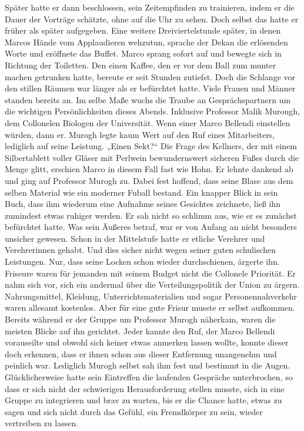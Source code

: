 Später hatte er dann beschlossen, sein Zeitempfinden zu trainieren, indem er die Dauer der Vorträge schätzte, ohne auf die Uhr zu sehen. Doch selbst das hatte er früher als später aufgegeben.
Eine weitere Dreiviertelstunde später, in denen Marcos Hände vom Applaudieren wehzutun, sprache der Dekan die erlösenden Worte und eröffnete das Buffet. Marco sprang sofort auf und bewegte sich in Richtung der Toiletten. Den einen Kaffee, den er vor dem Ball zum munter machen getrunken hatte, bereute er seit Stunden zutiefst. Doch die Schlange vor den stillen Räumen war länger als er befürchtet hatte. Viele Frauen und Männer standen bereits an. Im selbe Maße wuchs die Traube an Gesprächspartnern um die wichtigen Persönlichkeiten dieses Abends. Inklusive Professor Malik Murough, dem Collonelen Biologen der Universität. Wenn einer Marco Bellendi einstellen würden, dann er. Murogh legte kaum Wert auf den Ruf eines Mitarbeiters, lediglich auf seine Leistung.
„Einen Sekt?“ Die Frage des Kellners, der mit einem Silbertablett voller Gläser mit Perlwein bewundernswert sicheren Fußes durch die Menge glitt, erschien Marco in diesem Fall fast wie Hohn. Er lehnte dankend ab und ging auf Professor Murogh zu. Dabei fest hoffend, dass seine Blase aus dem selben Material wie ein moderner Fuball bestand.
Ein knapper Blick in sein Buch, dass ihm wiederum eine Aufnahme seines Gesichtes zeichnete, ließ ihn zumindest etwas ruhiger werden. Er sah nicht so schlimm aus, wie er es zunächst befürchtet hatte. Was sein Äußeres betraf, war er von Anfang an nicht besonders unsicher gewesen. Schon in der Mittelstufe hatte er etliche Verehrer und Verehrerinnen gehabt. Und dies sicher nicht wegen seiner guten schulischen Leistungen.
Nur, dass seine Locken schon wieder durchschienen, ärgerte ihn. Friseure waren für jemanden mit seinem Budget nicht die Collonele Priorität. Er nahm sich vor, sich ein andermal über die Verteilungspolitik der Union zu ärgern. Nahrungsmittel, Kleidung, Unterrichtsmaterialien und sogar Personennahverkehr waren allesamt kostenlos. Aber für eine gute Frisur musste er selbst aufkommen.
Bereits während er der Gruppe um Professor Murogh näherkam, waren die meisten Blicke auf ihn gerichtet. Jeder kannte den Ruf, der Marco Bellendi vorauseilte und obwohl sich keiner etwas anmerken lassen wollte, konnte dieser doch erkennen, dass er ihnen schon aus dieser Entfernung unangenehm und peinlich war. Lediglich Murogh selbst sah ihm fest und bestimmt in die Augen.
Glücklicherweise hatte sein Eintreffen die laufenden Gespräche unterbrochen, so dass er sich nicht der schwierigen Herausforderung stellen musste, sich in eine Gruppe zu integrieren und brav zu warten, bis er die Chance hatte, etwas zu sagen und sich nicht durch das Gefühl, ein Fremdkörper zu sein, wieder vertreiben zu lassen.
